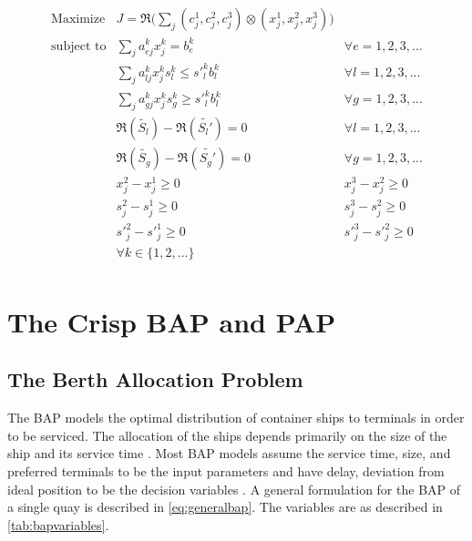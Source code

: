 \documentclass[11pt,a4paper,final]{article}
\begin{document}
\begin{equation}
\label{eq:kumar-kaurs-crisp}
\begin{array}{lll}
\text{Maximize}   & J = \mathfrak{R}\Big(\sum_j (c_j^1,c_j^2,c_j^3) \otimes (x_j^1,x_j^2,x_j^3)\Big) & \\
\text{subject to} & \sum_j a_{ej}^k x_j^k = b_e^k &  \forall e = 1,2,3,...                  \\
                  & \sum_j a_{lj}^k x_j^k s_l^k \le s'_l^k b_l^k &  \forall l = 1,2,3,...     \\
                  & \sum_j a_{gj}^k x_j^k s_g^k \ge s'_l^k b_l^k  &  \forall g = 1,2,3,...    \\
                  & \mathfrak{R}(\tilde{S_l}) - \mathfrak{R}(\tilde{S_l'}) = 0 & \forall l = 1,2,3,...           \\
                  & \mathfrak{R}(\tilde{S_g}) - \mathfrak{R}(\tilde{S_g'}) = 0 & \forall g = 1,2,3,...           \\
                  & x_j^2 - x_j^1 \ge 0         & x_j^3 - x_j^2 \ge 0 \\
                  & s_j^2 - s_j^1 \ge 0         & s_j^3 - s_j^2 \ge 0 \\
                  & s'_j^2 - s'_j^1 \ge 0         & s'_j^3 - s'_j^2 \ge 0 \\
                  & \forall k \in \{1,2,...\}        &                                     \\
\end{array}
\end{equation}

\section{The Crisp BAP and PAP}
\label{sec:org78f646e}
\subsection{The Berth Allocation Problem}
\label{sec:orgcfe67ca}
The BAP models the optimal distribution of container ships to terminals in order to be serviced. The allocation of the
ships depends primarily on the size of the ship and its service time
\cite{frojan-2015-contin-berth,imai-2001-dynam-berth,buhrkal-2011-model-discr}. Most BAP models assume the service
time, size, and preferred terminals to be the input parameters and have delay, deviation from ideal position to be the decision
variables \cite{frojan-2015-contin-berth,imai-2001-dynam-berth,buhrkal-2011-model-discr}. A general formulation for the
BAP of a single quay is described in \autoref{eq:generalbap}. The variables are as described in \autoref{tab:bapvariables}.
\end{document}
